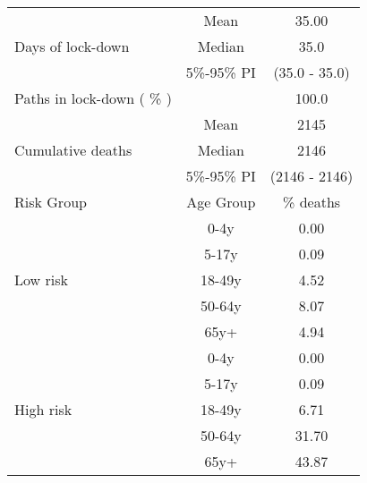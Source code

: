 \documentclass{article}
\begin{document}
\begin{table}[th]
\centering
\begin{tabular}{p{4cm}cc}
\toprule
\multirow{3}{*}{Days   of lock-down} & Mean      & 35.00                        \\ \cmidrule(l){2-3} 
                                     & Median    & 35.0                      \\ \cmidrule(l){2-3} 
                                     & 5\%-95\% PI & (35.0 - 35.0)       \\ \midrule 
\multirow{1}{*}{Paths in lock-down ( \% )} &      &         100.0              \\   \midrule                     
\multirow{3}{\hsize}{Cumulative deaths}       & Mean      & 2145 \\ \cmidrule(l){2-3} 
                                     & Median    & 2146                        \\ \cmidrule(l){2-3} 
                                     & 5\%-95\% PI & (2146 - 2146)           \\  \midrule
Risk Group                           & Age Group & \multicolumn{1}{c}{\% deaths}        \\  \midrule
\multirow{5}{*}{Low   risk}          & 0-4y      & 0.00                         \\ \cmidrule(l){2-3} 
                                     & 5-17y     & 0.09                         \\ \cmidrule(l){2-3} 
                                     & 18-49y    & 4.52                         \\ \cmidrule(l){2-3} 
                                     & 50-64y    & 8.07                         \\ \cmidrule(l){2-3} 
                                     & 65y+      & 4.94                         \\ \midrule
\multirow{5}{*}{High   risk}         & 0-4y      & 0.00                         \\ \cmidrule(l){2-3} 
                                     & 5-17y     & 0.09                         \\ \cmidrule(l){2-3} 
                                     & 18-49y    & 6.71                         \\ \cmidrule(l){2-3} 
                                     & 50-64y    & 31.70                         \\ \cmidrule(l){2-3} 
                                     & 65y+      & 43.87                         \\ \midrule

\end{tabular}
\end{table}
\end{document}
